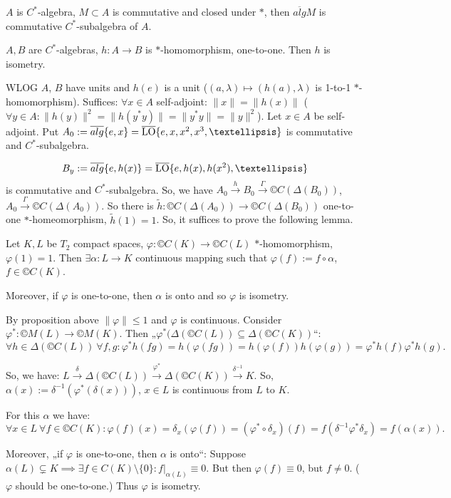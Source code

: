 \documentclass[12pt]{article}					%
\begin{document}
\begin{tvrzeni}[Fact]
	$A$ is $C^*$-algebra, $M \subset A$ is commutative and closed under $*$, then $\overline{alg} M$ is commutative $C^*$-subalgebra of $A$.
\end{tvrzeni}

\begin{veta}
	$A, B$ are $C^*$-algebras, $h: A \rightarrow B$ is $*$-homomorphism, one-to-one. Then $h$ is isometry.

	\begin{dukazin}
		WLOG $A$, $B$ have units and $h(e)$ is a unit ($(a, λ) \mapsto (h(a), λ)$ is 1-to-1 \hbox{$*$-homomorphism}). Suffices: $\forall x \in A$ self-adjoint: $\|x\| = \|h(x)\|$ ($\forall y \in A: \|h(y)\|^2 = \|h(y^*y)\| = \|y^* y\| = \|y\|^2$). Let $x \in A$ be self-adjoint. Put $A_0 := \overline{alg}\{e, x\} = \overline{\LO}\{e, x, x^2, x^3, …\}$ is commutative and $C^*$-subalgebra.

		$$ B_y := \overline{alg}\{e, h(x)\} = \overline{\LO}\{e, h(x), h(x^2), …\} $$
		is commutative and $C^*$-subalgebra. So, we have $A_0 \overset{h} \rightarrow B_0 \overset{Γ}\rightarrow ©C(Δ(B_0))$, $A_0 \overset{Γ}\rightarrow ©C(Δ(A_0))$. So there is $\tilde h: ©C(Δ(A_0)) \rightarrow ©C(Δ(B_0))$ one-to-one $*$-homeomorphism, $\tilde h(1) = 1$. So, it suffices to prove the following lemma.
	\end{dukazin}
\end{veta}

\begin{lemma}
	Let $K, L$ be $T_2$ compact spaces, $φ: ©C(K) \rightarrow ©C(L)$ $*$-homomorphism, $φ(1) = 1$. Then $\exists α: L \rightarrow K$ continuous mapping such that $φ(f) := f ∘ α$, $f \in ©C(K)$.

	Moreover, if $φ$ is one-to-one, then $α$ is onto and so $φ$ is isometry.

	\begin{dukazin}
		By proposition above $\|φ\| ≤ 1$ and $φ$ is continuous. Consider $φ^*: ©M(L) \rightarrow ©M(K)$. Then „$φ^*(Δ(©C(L)) \subseteq Δ(©C(K))$“:
		$$ \forall h \in Δ(©C(L))\ \forall f, g: φ^*h(f g) = h(φ(f g)) = h(φ(f))h (φ(g)) = φ^*h(f) φ^*h(g). $$

		So, we have: $L \overset{δ}\rightarrow Δ(©C(L)) \overset{φ^*}\rightarrow Δ(©C(K)) \overset{δ^{-1}} \rightarrow K$. So, $α(x) := δ^{-1}(φ^*(δ(x)))$, $x \in L$ is continuous from $L$ to $K$.

		For this $α$ we have:
		$$ \forall x \in L\ \forall f \in ©C(K): φ(f)(x) = δ_x(φ(f)) = (φ^* ∘ δ_x)(f) = f(δ^{-1} φ^* δ_x) = f(α(x)). $$

		Moreover, „if $φ$ is one-to-one, then $α$ is onto“: Suppose $α(L) \subsetneq K \implies \exists f \in C(K) \setminus \{0\}: f|_{\alpha(L)} ≡ 0$. But then $φ(f) ≡ 0$, but $f ≠ 0$. \lightning ($φ$ should be one-to-one.) Thus $φ$ is isometry.
	\end{dukazin}
\end{lemma}
\end{document}
